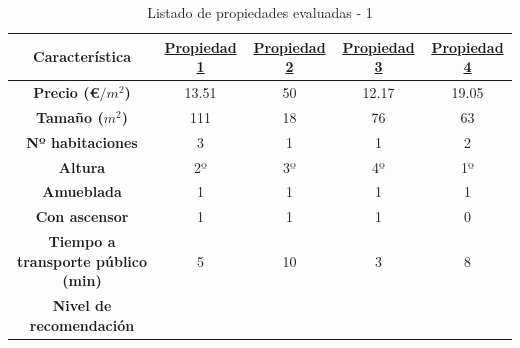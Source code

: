 \documentclass[12pt]{report} %
\begin{document}
    \begin{table}[h]
        \center
        \begin{tabular}{|c|cccc|}
            \hline
            \textbf{Característica} & \href{https://www.idealista.com/inmueble/106565852/}{Propiedad 1} & \href{https://www.idealista.com/inmueble/103969285/}{Propiedad 2} & \href{https://www.idealista.com/inmueble/104278344/}{Propiedad 3} & \href{https://www.idealista.com/inmueble/106562120/}{Propiedad 4} \\
            \hline
            \hline
            \textbf{Precio (€$/m^2$)}                  & 13.51 & 50    & 12.17 & 19.05 \\
            \textbf{Tamaño ($m^2$)}                    & 111   & 18    & 76    & 63    \\
            \textbf{Nº habitaciones}                   & 3     & 1     & 1     & 2     \\
            \textbf{Altura}                            & 2º    & 3º    & 4º    & 1º    \\
            \textbf{Amueblada\footnotemark[1]}         & 1     & 1     & 1     & 1     \\
            \textbf{Con ascensor\footnotemark[1]}      & 1     & 1     & 1     & 0     \\
            \textbf{Tiempo a transporte público (min)} & 5     & 10    & 3     & 8     \\
            \textbf{Nivel de recomendación}            &       &       &       &       \\
            \hline
        \end{tabular}
        \caption{Listado de propiedades evaluadas - 1}
    \end{table}
\end{document}
